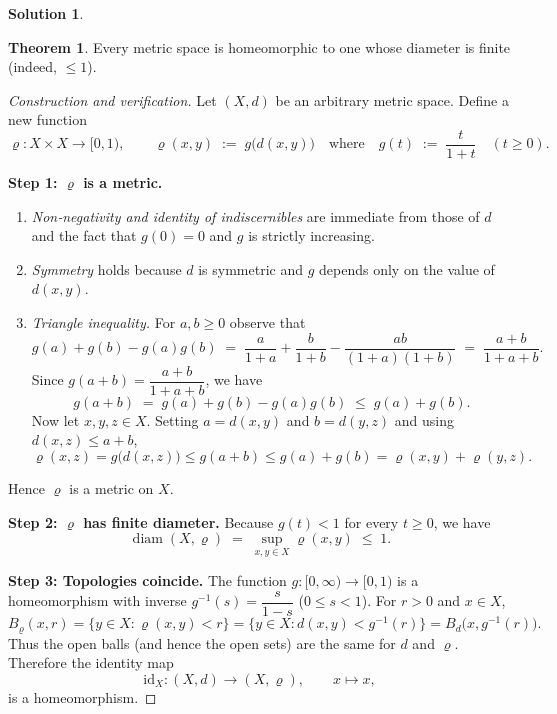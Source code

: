\documentclass[12pt]{article}
\theoremstyle{definition} %
\newtheorem{solution}{Solution}
\newtheorem{theorem}{Theorem}
\theoremstyle{plain} %
\begin{document}
\begin{solution}
  \begin{theorem}
    Every metric space is homeomorphic to one whose diameter is finite (indeed, $\le 1$).
    \end{theorem}
    
    \begin{proof}[Construction and verification]
    Let $(X,d)$ be an arbitrary metric space.  
    Define a new function
    \[
    \varrho:X\times X\longrightarrow[0,1),\qquad
    \varrho(x,y)\;:=\;g\!\bigl(d(x,y)\bigr)
    \quad\text{where}\quad
    g(t)\;:=\;\frac{t}{1+t}\quad(t\ge 0).
    \]
    
    \smallskip
    \noindent\textbf{Step 1: $\varrho$ is a metric.}
    \begin{enumerate}
        \item \emph{Non‑negativity and identity of indiscernibles} are immediate from those of $d$ and the fact that $g(0)=0$ and $g$ is strictly increasing.
        \item \emph{Symmetry} holds because $d$ is symmetric and $g$ depends only on the value of $d(x,y)$.
        \item \emph{Triangle inequality.}  
              For $a,b\ge 0$ observe that
              \[
                  g(a)+g(b)-g(a)g(b)
                  \;=\;\frac{a}{1+a}+\frac{b}{1+b}-\frac{ab}{(1+a)(1+b)}
                  \;=\;\frac{a+b}{1+a+b}.
              \]
              Since $g(a+b)=\dfrac{a+b}{1+a+b}$, we have
              \[
                  g(a+b)\;=\;g(a)+g(b)-g(a)g(b)\;\le\;g(a)+g(b).
              \]
              Now let $x,y,z\in X$.  
              Setting $a=d(x,y)$ and $b=d(y,z)$ and using $d(x,z)\le a+b$,
              \[
                    \varrho(x,z)
                    =g\!\bigl(d(x,z)\bigr)
                    \le g(a+b)
                    \le g(a)+g(b)
                    =\varrho(x,y)+\varrho(y,z).
              \]
    \end{enumerate}
    Hence $\varrho$ is a metric on $X$.
    
    \smallskip
    \noindent\textbf{Step 2: $\varrho$ has finite diameter.}
    Because $g(t)<1$ for every $t\ge 0$, we have
    \[
    \operatorname{diam}(X,\varrho)\;=\;\sup_{x,y\in X}\varrho(x,y)\;\le\;1.
    \]
    
    \smallskip
    \noindent\textbf{Step 3: Topologies coincide.}
    The function $g:[0,\infty)\to[0,1)$ is a homeomorphism with inverse
    $g^{-1}(s)=\dfrac{s}{1-s}$ ($0\le s<1$).  
    For $r>0$ and $x\in X$,
    \[
    B_{\varrho}(x,r)=\bigl\{y\in X : \varrho(x,y)<r\bigr\}
                   =\bigl\{y\in X : d(x,y)<g^{-1}(r)\bigr\}
                   =B_{d}\!\bigl(x,g^{-1}(r)\bigr).
    \]
    Thus the open balls (and hence the open sets) are the same for $d$ and $\varrho$.
    Therefore the identity map
    \[
    \text{id}_X:(X,d)\longrightarrow (X,\varrho),\qquad x\mapsto x,
    \]
    is a homeomorphism.
    

\end{proof}
\end{solution}
\end{document}
